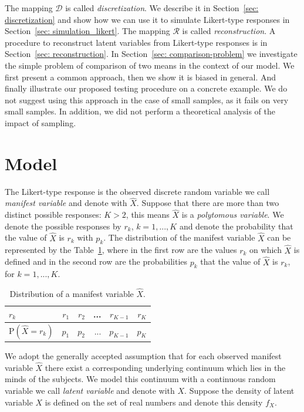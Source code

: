 \documentclass[10pt]{article}
\begin{document}
The mapping $\mathcal{D}$ is called {\it discretization}. We describe it in Section~\ref{sec: discretization} and show how we can use it to simulate Likert-type responses in Section~\ref{sec: simulation_likert}. The mapping $\mathcal{R}$ is called {\it reconstruction}. A procedure to reconstruct latent variables from Likert-type responses is in Section~\ref{sec: reconstruction}. In Section~\ref{sec: comparison-problem} we investigate the simple problem of comparison of two means in the context of our model. We first present a common approach, then we show it is biased in general. And finally illustrate our proposed testing procedure on a concrete example. We do not suggest using this approach in the case of small samples, as it fails on very small samples. In addition, we did not perform a theoretical analysis of the impact of sampling.

\section{Model} \label{sec: model}
The Likert-type response is the observed discrete random variable we call {\it manifest variable} and denote with $\hat{X}$. Suppose that there are more than two distinct possible responses: $K>2$, this means $\hat{X}$ is a {\it polytomous variable}. We denote the possible responses by $r_{k}$, $k = 1, ..., K$ and denote the probability that the value of $\hat{X}$ is $r_{k}$ with $p_{k}$. The distribution of the manifest variable $\hat{X}$ can be represented by the Table~\ref{tab: manifest}, where in the first row are the values $r_ {k}$ on which $\hat{X}$ is defined and in the second row are the probabilities $p_{k}$ that the value of $\hat{X}$ is $r_{k}$, for $k = 1, ..., K$.

\begin{table}[H]
\centering
\begin{tabular}{l|rrrrr}
	$r_{k}$ & $r_{1}$ & $r_{2}$ & ... & $r_{K-1}$ & $r_{K}$ \rule{0pt}{3ex} \\ 
  \hline
  	$\mathrm{P}(\hat{X} = r_{k})$ & $p_{1}$ & $p_{2}$ & ... & $p_{K-1}$ & $p_{K}$ \rule{0pt}{3ex} \\
\end{tabular}
\caption{ Distribution of a manifest variable $\hat{X}$.}
\label{tab: manifest}
\end{table}

We adopt the generally accepted assumption \cite{Bollen} that for each observed manifest variable $\hat{X}$ there exist a corresponding underlying continuum which lies in the minds of the subjects. We model this continuum with a continuous random variable we call {\it latent variable} and denote with $X$. Suppose the density of latent variable $X$ is defined on the set of real numbers and denote this density $f_{X}$. 
\end{document}
